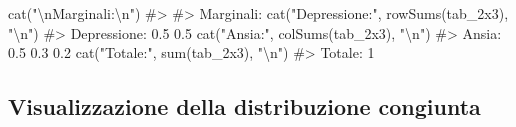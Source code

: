 \documentclass[
  letterpaper,
  DIV=11,
  numbers=noendperiod,
  oneside]{scrreprt}
\newenvironment{Shaded}{\begin{snugshade}}{\end{snugshade}}
\newcommand{\CommentTok}[1]{\textcolor[rgb]{0.37,0.37,0.37}{#1}}
\newcommand{\FunctionTok}[1]{\textcolor[rgb]{0.28,0.35,0.67}{#1}}
\newcommand{\NormalTok}[1]{\textcolor[rgb]{0.00,0.23,0.31}{#1}}
\newcommand{\SpecialCharTok}[1]{\textcolor[rgb]{0.37,0.37,0.37}{#1}}
\newcommand{\StringTok}[1]{\textcolor[rgb]{0.13,0.47,0.30}{#1}}
\theoremstyle{definition}
\theoremstyle{plain}
\theoremstyle{definition}
\theoremstyle{remark}
\begin{document}
\begin{Shaded}
\begin{Highlighting}[]
\FunctionTok{cat}\NormalTok{(}\StringTok{"}\SpecialCharTok{\textbackslash{}n}\StringTok{Marginali:}\SpecialCharTok{\textbackslash{}n}\StringTok{"}\NormalTok{)}
\CommentTok{\#\textgreater{} }
\CommentTok{\#\textgreater{} Marginali:}
\FunctionTok{cat}\NormalTok{(}\StringTok{"Depressione:"}\NormalTok{, }\FunctionTok{rowSums}\NormalTok{(tab\_2x3), }\StringTok{"}\SpecialCharTok{\textbackslash{}n}\StringTok{"}\NormalTok{)}
\CommentTok{\#\textgreater{} Depressione: 0.5 0.5}
\FunctionTok{cat}\NormalTok{(}\StringTok{"Ansia:"}\NormalTok{, }\FunctionTok{colSums}\NormalTok{(tab\_2x3), }\StringTok{"}\SpecialCharTok{\textbackslash{}n}\StringTok{"}\NormalTok{)}
\CommentTok{\#\textgreater{} Ansia: 0.5 0.3 0.2}
\FunctionTok{cat}\NormalTok{(}\StringTok{"Totale:"}\NormalTok{, }\FunctionTok{sum}\NormalTok{(tab\_2x3), }\StringTok{"}\SpecialCharTok{\textbackslash{}n}\StringTok{"}\NormalTok{)}
\CommentTok{\#\textgreater{} Totale: 1}
\end{Highlighting}
\end{Shaded}

\subsection{Visualizzazione della distribuzione
congiunta}\label{visualizzazione-della-distribuzione-congiunta}
\end{document}
